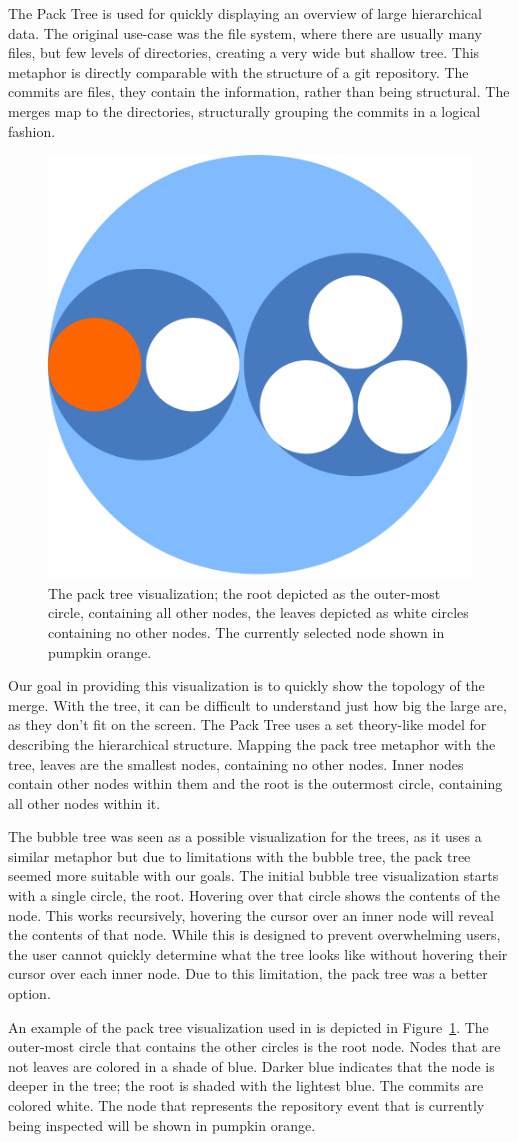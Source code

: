 The Pack Tree\cite{Wang2006} is used for quickly displaying an overview
of large hierarchical data. The original use-case was the file system,
where there are usually many files, but few levels of directories,
creating a very wide but shallow tree. This metaphor is directly
comparable with the structure of a git repository. The commits are
files, they contain the information, rather than being structural. The
merges map to the directories, structurally grouping the commits in a
logical fashion.

\begin{figure}[htpb]
  \centering
  \includegraphics[width=0.4\linewidth]{Figures/Linvis/linvis_bubble.pdf}
  \caption{The pack tree visualization; the root depicted as the
    outer-most circle, containing all other nodes, the leaves depicted
    as white circles containing no other nodes. The currently selected
    node shown in pumpkin orange.}
  \label{fig:linvis_bubble_tree}
\end{figure}

Our goal in providing this visualization is to quickly show the topology
of the merge. With the \rt{} tree, it can be difficult to understand
just how big the large \mt{} are, as they don't fit on the screen. The
Pack Tree uses a set theory-like model for describing the hierarchical
structure. Mapping the pack tree metaphor with the tree, leaves are the
smallest nodes, containing no other nodes. Inner nodes contain other
nodes within them and the root is the outermost circle, containing all
other nodes within it.

The bubble tree\cite{Boardman2000} was seen as a possible visualization
for the trees, as it uses a similar metaphor but due to limitations with
the bubble tree, the pack tree seemed more suitable with our goals. The
initial bubble tree visualization starts with a single circle, the root.
Hovering over that circle shows the contents of the node. This works
recursively, hovering the cursor over an inner node will reveal the
contents of that node. While this is designed to prevent overwhelming
users, the user cannot quickly determine what the tree looks like
without hovering their cursor over each inner node. Due to this
limitation, the pack tree was a better option.

An example of the pack tree visualization used in \tool{} is depicted in
Figure~\ref{fig:linvis_bubble_tree}. The outer-most circle that contains
the other circles is the root node. Nodes that are not leaves are
colored in a shade of blue. Darker blue indicates that the node is
deeper in the tree; the root is shaded with the lightest blue. The
commits are colored white. The node that represents the repository event
that is currently being inspected will be shown in pumpkin orange.
